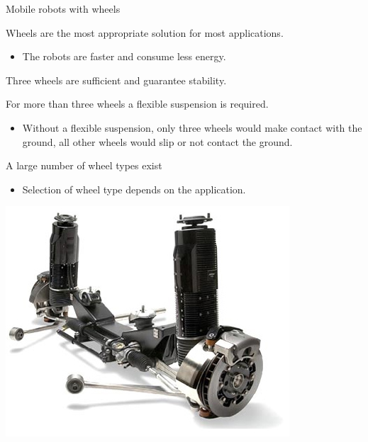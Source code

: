 \documentclass[compress]{beamer}
\begin{document}
\begin{frame}{Mobile robots with wheels}

Wheels are the most appropriate solution for most applications.

\begin{itemize}
    \item The robots are faster and consume less energy.
\end{itemize}

Three wheels are sufficient and guarantee stability.

For more than three wheels a flexible suspension is required.

\begin{itemize}
    \item Without a flexible suspension, only three wheels would make contact
  with the ground, all other wheels would slip or not contact the
  ground.
\end{itemize}

A large number of wheel types exist

\begin{itemize}
    \item Selection of wheel type depends on the application.
\end{itemize}

    \begin{center}
        \includegraphics[width=0.8\linewidth]{image1}
    \end{center}

\end{frame}
\end{document}
